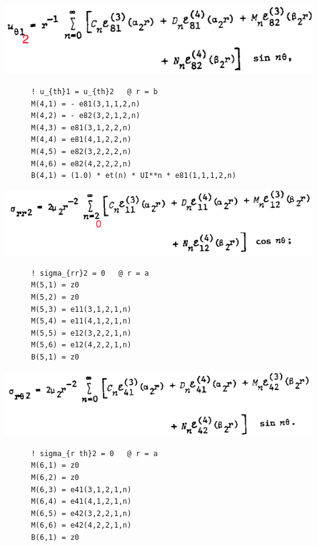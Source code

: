 \documentclass [11pt,spanish]{article}
\begin{document}
\includegraphics[scale=0.5]{ut2}
\begingroup
\fontsize{10pt}{12pt}
\selectfont
{}
\begin{shaded}
\begin{verbatim}
      ! u_{th}1 = u_{th}2   @ r = b
      M(4,1) = - e81(3,1,1,2,n) 
      M(4,2) = - e82(3,2,1,2,n) 
      M(4,3) = e81(3,1,2,2,n) 
      M(4,4) = e81(4,1,2,2,n) 
      M(4,5) = e82(3,2,2,2,n)
      M(4,6) = e82(4,2,2,2,n)
      B(4,1) = (1.0) * et(n) * UI**n * e81(1,1,1,2,n)
\end{verbatim}
\end{shaded}
\endgroup
\includegraphics[scale=0.5]{srr2}
\begingroup
\fontsize{10pt}{12pt}
\selectfont
{}
\begin{shaded}
\begin{verbatim}
      ! sigma_{rr}2 = 0   @ r = a
      M(5,1) = z0
      M(5,2) = z0
      M(5,3) = e11(3,1,2,1,n)
      M(5,4) = e11(4,1,2,1,n)
      M(5,5) = e12(3,2,2,1,n)
      M(5,6) = e12(4,2,2,1,n)
      B(5,1) = z0
\end{verbatim}
\end{shaded}
\endgroup
\includegraphics[scale=0.5]{srt2}
\begingroup
\fontsize{10pt}{12pt}
\selectfont
{}
\begin{shaded}
\begin{verbatim}
      ! sigma_{r th}2 = 0   @ r = a
      M(6,1) = z0
      M(6,2) = z0
      M(6,3) = e41(3,1,2,1,n)
      M(6,4) = e41(4,1,2,1,n)
      M(6,5) = e42(3,2,2,1,n)
      M(6,6) = e42(4,2,2,1,n)
      B(6,1) = z0

\end{verbatim}
\end{shaded}
\end{document}
